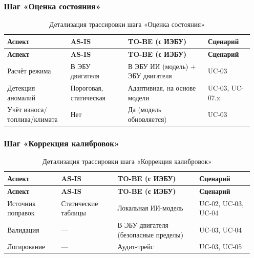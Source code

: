 \documentclass[14pt, a4paper]{extarticle}
\begin{document}
				\subsubsection{Шаг «Оценка состояния»}
				
				{\fontsize{9}{11}\selectfont
					\begin{xltabular}{\textwidth}{|L|L|L|L|}
					\caption{Детализация трассировки шага «Оценка состояния»}\label{tab:trace-estimate}\\
					\hline
					\textbf{Аспект} & \textbf{AS-IS} & \textbf{TO-BE (с ИЭБУ)} & \textbf{Сценарий} \\
					\hline
					\endfirsthead
					\hline
					\textbf{Аспект} & \textbf{AS-IS} & \textbf{TO-BE (с ИЭБУ)} & \textbf{Сценарий} \\
					\hline
					\endhead
					\hline
					\endfoot
					\hline
					\endlastfoot
					Расчёт режима & В ЭБУ двигателя & В ЭБУ ИИ (модель) + ЭБУ двигателя & UC-03 \\
					\hline
					Детекция аномалий & Пороговая, статическая & Адаптивная, на основе модели & UC-03, UC-07.x \\
					\hline
					Учёт износа/топлива/климата & Нет & Да (модель обновляется) & UC-03 \\
					\hline
				\end{xltabular}}
				
				\subsubsection{Шаг «Коррекция калибровок»}
				
				{\fontsize{9}{11}\selectfont
					\begin{xltabular}{\textwidth}{|L|L|L|L|}
					\caption{Детализация трассировки шага «Коррекция калибровок»}\label{tab:trace-correction}\\
					\hline
					\textbf{Аспект} & \textbf{AS-IS} & \textbf{TO-BE (с ИЭБУ)} & \textbf{Сценарий} \\
					\hline
					\endfirsthead
					\hline
					\textbf{Аспект} & \textbf{AS-IS} & \textbf{TO-BE (с ИЭБУ)} & \textbf{Сценарий} \\
					\hline
					\endhead
					\hline
					\endfoot
					\hline
					\endlastfoot
					Источник поправок & Статические таблицы & Локальная ИИ-модель & UC-02, UC-03, UC-04 \\
					\hline
					Валидация & — & В ЭБУ двигателя (безопасные пределы) & UC-03, UC-04 \\
					\hline
					Логирование & — & Аудит-трейс & UC-03, UC-05 \\
					\hline
				\end{xltabular}}
				
\end{document}
